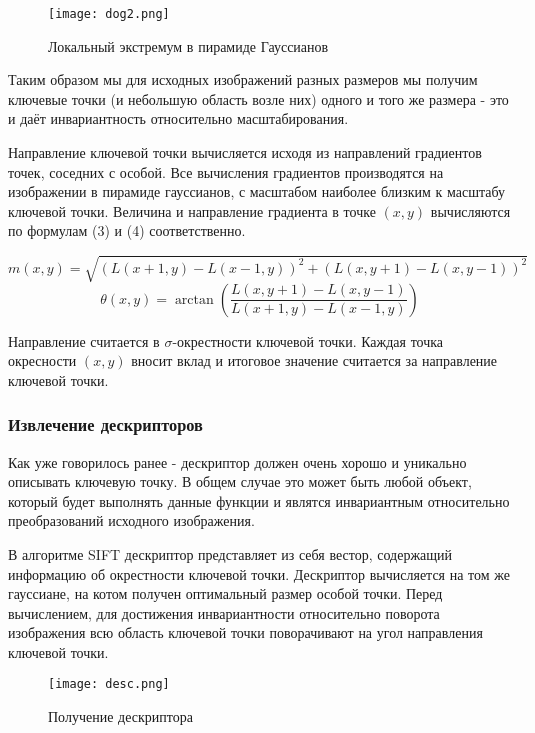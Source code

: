 \begin{figure}[h]
    \centering
    \texttt{[image: dog2.png]}
    \caption{Локальный экстремум в пирамиде Гауссианов}
    \label{fig:dog2}
\end{figure}

Таким образом мы для исходных изображений разных размеров мы получим ключевые точки (и небольшую область возле них) одного и того же размера - это и даёт инвариантность относительно масштабирования.

\vspace{1em}

Направление ключевой точки вычисляется исходя из направлений градиентов точек, соседних с особой. Все вычисления градиентов производятся на изображении в пирамиде гауссианов, с масштабом наиболее близким к масштабу ключевой точки. Величина и направление градиента в точке $(x,y)$ вычисляются по формулам (3) и (4) соответственно.

\begin{equation}
    m(x,y)=\sqrt{(L(x+1,y) - L(x-1,y))^2 + (L(x,y+1) - L(x,y-1))^2}
\end{equation}
\begin{equation}
    \theta(x,y)=\arctan{\left(\frac{L(x,y+1) - L(x,y-1)}{L(x+1,y) - L(x-1,y)}\right)}
\end{equation}

Направление считается в $\sigma$-окрестности ключевой точки.  Каждая точка окресности $(x, y)$ вносит вклад и итоговое значение считается за направление ключевой точки.

\subsubsection*{Извлечение дескрипторов}

\tab Как уже говорилось ранее - дескриптор должен очень хорошо и уникально описывать ключевую точку. В общем случае это может быть любой объект, который будет выполнять данные функции и являтся инвариантным относительно преобразований исходного изображения.

В алгоритме SIFT дескриптор представляет из себя вестор, содержащий информацию об окрестности ключевой точки. Дескриптор вычисляется на том же гауссиане, на котом получен оптимальный размер особой точки. Перед вычислением, для достижения инвариантности относительно поворота изображения всю область ключевой точки поворачивают на угол направления ключевой точки.

\begin{figure}[h]
    \centering
    \texttt{[image: desc.png]}
    \caption{Получение дескриптора}
    \label{fig:desc}
\end{figure}

